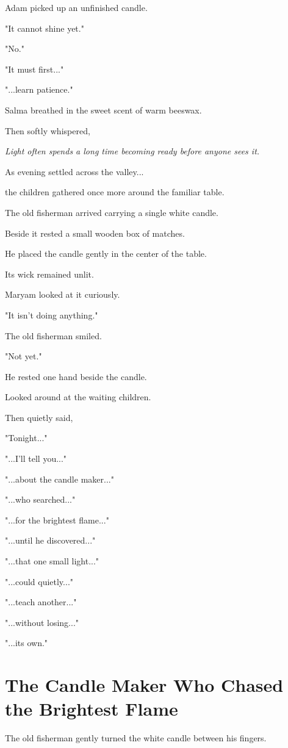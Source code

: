 \documentclass[12pt,openany]{book}
\begin{document}
Adam picked up an unfinished candle.

"It cannot shine yet."

"No."

"It must first..."

"...learn patience."

Salma breathed in the sweet scent of warm beeswax.

Then softly whispered,

\emph{Light often spends a long time becoming ready before anyone sees it.}

As evening settled across the valley...

the children gathered once more around the familiar table.

The old fisherman arrived carrying a single white candle.

Beside it rested a small wooden box of matches.

He placed the candle gently in the center of the table.

Its wick remained unlit.

Maryam looked at it curiously.

"It isn't doing anything."

The old fisherman smiled.

"Not yet."

He rested one hand beside the candle.

Looked around at the waiting children.

Then quietly said,

"Tonight..."

"...I'll tell you..."

"...about the candle maker..."

"...who searched..."

"...for the brightest flame..."

"...until he discovered..."

"...that one small light..."

"...could quietly..."

"...teach another..."

"...without losing..."

"...its own."
\section*{The Candle Maker Who Chased the Brightest Flame}

The old fisherman gently turned the white candle between his fingers.
\end{document}
